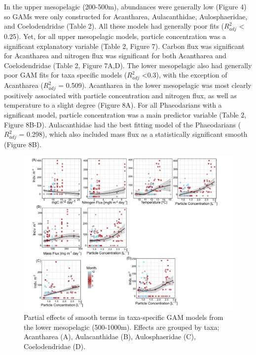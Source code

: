 \documentclass[
]{article}
\begin{document}
In the upper mesopelagic (200-500m), abundances were generally low
(Figure 4) so GAMs were only constructed for Acantharea, Aulacanthidae,
Aulosphaeridae, and Coelodendridae (Table 2). All these models had
generally poor fits (\(R^2_{adj}\) \textless{} 0.25). Yet, for all upper
mesopelagic models, particle concentration was a significant explanatory
variable (Table 2, Figure 7). Carbon flux was significant for Acantharea
and nitrogen flux was significant for both Acantharea and Coelodendridae
(Table 2, Figure 7A,D). The lower mesopelagic also had generally poor
GAM fits for taxa specific models (\(R^2_{adj}\) \textless0.3), with the
exception of Acantharea (\(R^2_{adj}\) = 0.509). Acantharea in the lower
mesopelagic was most clearly positively associated with particle
concentration and nitrogen flux, as well as temperature to a slight
degree (Figure 8A). For all Phaeodarians with a significant model,
particle concentration was a main predictor variable (Table 2, Figure
8B-D). Aulacanthidae had the best fitting model of the Phaeodarians
(\(R^2_{adj}\) = 0.298), which also included mass flux as a
statistically significant smooth (Figure 8B).

\begin{figure}

{\centering \includegraphics{images/08_lomeso-partials.pdf}

}

\caption{Partial effects of smooth terms in taxa-specific GAM models
from the lower mesopelagic (500-1000m). Effects are grouped by taxa;
Acantharea (A), Aulacanthidae (B), Aulosphaeridae (C), Coelodendridae
(D).}

\end{figure}
\end{document}

